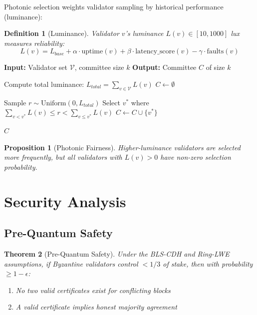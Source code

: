 \documentclass[11pt,a4paper]{article}
\newtheorem{theorem}{Theorem}
\newtheorem{proposition}[theorem]{Proposition}
\newtheorem{definition}{Definition}
\begin{document}
Photonic selection weights validator sampling by historical performance (luminance):

\begin{definition}[Luminance]
Validator $v$'s luminance $L(v) \in [10, 1000]$ lux measures reliability:
\begin{equation}
L(v) = L_{base} + \alpha \cdot \text{uptime}(v) + \beta \cdot \text{latency\_score}(v) - \gamma \cdot \text{faults}(v)
\end{equation}
\end{definition}

\begin{algorithm}
\caption{Photonic Selection}
\begin{algorithmic}[1]
\STATE \textbf{Input:} Validator set $\mathcal{V}$, committee size $k$
\STATE \textbf{Output:} Committee $C$ of size $k$

\STATE Compute total luminance: $L_{total} = \sum_{v \in \mathcal{V}} L(v)$
\STATE $C \gets \emptyset$

    \STATE Sample $r \sim \text{Uniform}(0, L_{total})$
    \STATE Select $v^*$ where $\sum_{v < v^*} L(v) \leq r < \sum_{v \leq v^*} L(v)$
        \STATE $C \gets C \cup \{v^*\}$
    \ENDIF
\ENDWHILE

\RETURN $C$
\end{algorithmic}
\end{algorithm}

\begin{proposition}[Photonic Fairness]
Higher-luminance validators are selected more frequently, but all validators with $L(v) > 0$ have non-zero selection probability.
\end{proposition}

\section{Security Analysis}

\subsection{Pre-Quantum Safety}

\begin{theorem}[Pre-Quantum Safety]
\label{thm:prequantum}
Under the BLS-CDH and Ring-LWE assumptions, if Byzantine validators control $< 1/3$ of stake, then with probability $\geq 1 - \epsilon$:
\begin{enumerate}
    \item No two valid certificates exist for conflicting blocks
    \item A valid certificate implies honest majority agreement
\end{enumerate}
\end{theorem}
\end{document}
